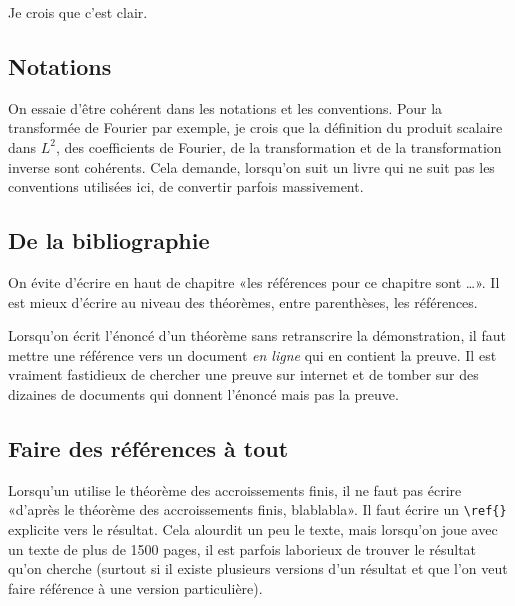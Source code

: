 Je crois que c'est clair.

\subsection{Notations}

On essaie d'être cohérent dans les notations et les conventions. Pour la transformée de Fourier par exemple, je crois que la définition du produit scalaire dans \( L^2\), des coefficients de Fourier, de la transformation et de la transformation inverse sont cohérents. Cela demande, lorsqu'on suit un livre qui ne suit pas les conventions utilisées ici, de convertir parfois massivement.

\subsection{De la bibliographie}

On évite d'écrire en haut de chapitre «les références pour ce chapitre sont \ldots». Il est mieux d'écrire au niveau des théorèmes, entre parenthèses, les références.

Lorsqu'on écrit l'énoncé d'un théorème sans retranscrire la démonstration, il faut mettre une référence vers un document \emph{en ligne} qui en contient la preuve. Il est vraiment fastidieux de chercher une preuve sur internet et de tomber sur des dizaines de documents qui donnent l'énoncé mais pas la preuve.

\subsection{Faire des références à tout}

Lorsqu'un utilise le théorème des accroissements finis, il ne faut pas écrire «d'après le théorème des accroissements finis, blablabla». Il faut écrire un \verb+\ref{}+ explicite vers le résultat. Cela alourdit un peu le texte, mais lorsqu'on joue avec un texte de plus de 1500 pages, il est parfois laborieux de trouver le résultat qu'on cherche (surtout si il existe plusieurs versions d'un résultat et que l'on veut faire référence à une version particulière).

